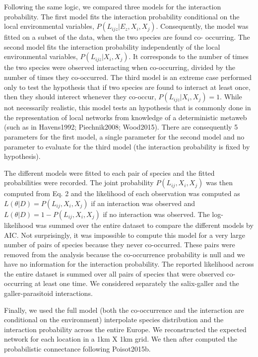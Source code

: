 \documentclass[12pt]{article}
\begin{document}
Following the same logic, we compared three models for the interaction
probability. The first model fits the interaction probability conditional on
the local environmental variables, $P(L_{ijz}|E_z,X_i,X_j)$. Consequently, the
model was fitted on a subset of the data, when the two species are found co-
occurring. The second model fits the interaction probability independently of
the local environmental variables, $P(L_{ijz}|X_i,X_j)$. It corresponds to the
number of times the two species were observed interacting when co-occurring,
divided by the number of times they co-occurred. The third model is an extreme
case performed only to test the hypothesis that if two species are found to
interact at least once, then they should interect whenever they co-occur,
$P(L_{ijz}|X_i,X_j)=1$. While not necessarily realistic, this model tests an
hypothesis that is commonly done in the representation of local networks from
knowledge of a deterministic metaweb (such as in Havens1992; Piechnik2008;
Wood2015). There are consequently 5 parameters for the first model, a single
parameter for the second model and no parameter to evaluate for the third
model (the interaction probability is fixed by hypothesis).

The different models were fitted to each pair of species and the fitted
probabilities were recorded. The joint probability $P(L_{ij},X_i,X_j)$ was
then computed from Eq. 2 and the likelihood of each observation was computed
as $L(\theta|D) = P(L_{ij},X_i,X_j)$ if an interaction was observed and
$L(\theta|D) = 1 - P(L_{ij},X_i,X_j)$ if no interaction was observed. The log-
likelihood was summed over the entire dataset to compare the different models
by AIC. Not surprisingly, it was impossible to compute this model for a very
large number of pairs of species because they never co-occurred. These pairs
were removed from the analysis because the co-occurrence probability is null
and we have no information for the interaction probability. The reported
likelihood across the entire dataset is summed over all pairs of species that
were observed co-occurring at least one time. We considered separately the
salix-galler and the galler-parasitoid interactions. 

Finally, we used the full model (both the co-occurrence and the interaction
are conditional on the environment) interpolate species
distribution and the interaction probability across the entire Europe. We 
reconstructed the expected network for each location in a 1km X 1km grid. We
then after computed the probabilistic connectance following Poisot2015b.
\end{document}
